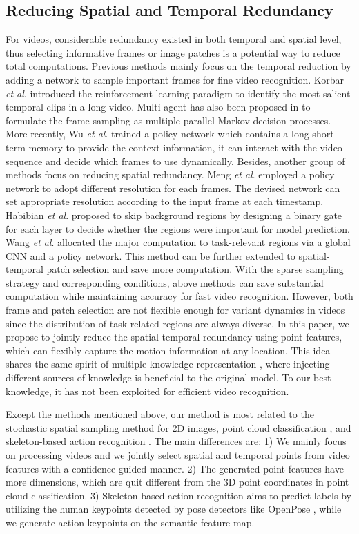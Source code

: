\documentclass[journal]{IEEEtran}
\newcommand{\etal}{\textit{et al}. }
\begin{document}
\subsection{Reducing Spatial and Temporal Redundancy}
For videos, considerable redundancy existed in both temporal and spatial level, thus selecting informative frames or image patches is a potential way to reduce total computations.
Previous methods mainly focus on the temporal reduction by adding a network to sample important frames for fine video recognition.
Korbar \etal \cite{korbar2019scsampler} introduced the reinforcement learning paradigm to identify the most salient temporal clips in a long video.
Multi-agent has also been proposed in \cite{wu2019multi} to formulate the frame sampling as multiple parallel Markov decision processes.
More recently, Wu \etal \cite{wu2020dynamic} trained a policy network which contains a long short-term memory to provide the context information, it can interact with the video sequence and decide which frames to use dynamically.
Besides, another group of methods focus on reducing spatial redundancy.
Meng \etal \cite{meng2020ar} employed a policy network to adopt different resolution for each frames.
The devised network can set appropriate resolution according to the input frame at each timestamp.
Habibian \etal \cite{habibian2021skip} proposed to skip background regions by designing a binary gate for each layer to decide whether the regions were important for model prediction.
Wang \etal \cite{Wang_2021_AdaFocus} allocated the major computation to task-relevant regions via a global CNN and a policy network.
This method can be further extended to spatial-temporal patch selection and save more computation.
With the sparse sampling strategy and corresponding conditions, above methods can save substantial computation while maintaining accuracy for fast video recognition.
However, both frame and patch selection are not flexible enough for variant dynamics in videos since the distribution of task-related regions are always diverse.
In this paper, we propose to jointly reduce the spatial-temporal redundancy using point features, which can flexibly capture the motion information at any location.
This idea shares the same spirit of multiple knowledge representation \cite{yang2021multi}, where injecting different sources of knowledge is beneficial to the original model.
To our best knowledge, it has not been exploited for efficient video recognition.

Except the methods mentioned above, our method is most related to the stochastic spatial sampling method \cite{xie2020spatially} for 2D images, point cloud classification \cite{qi2017pointnet, qi2017pointnet++}, and skeleton-based action recognition \cite{shi2020skeleton, bian2021structural}.
The main differences are:
1) We mainly focus on processing videos and we jointly select spatial and temporal points from video features with a confidence guided manner.
2) The generated point features have more dimensions, which are quit different from the 3D point coordinates in point cloud classification.
3) Skeleton-based action recognition aims to predict labels by utilizing the human keypoints detected by pose detectors like OpenPose \cite{cao2017realtime}, while we generate action keypoints on the semantic feature map.
\end{document}
